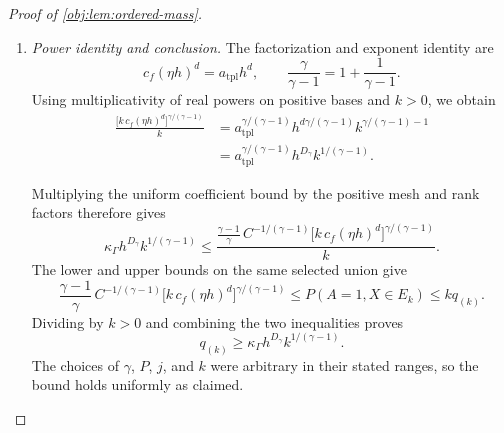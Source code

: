 \begin{proof}[Proof of \cref{obj:lem:ordered-mass}]
\begin{enumerate}
More explicitly, each microcell is the rectangle
\[
E_{Q\ell}
=
\prod_{i=1}^d
\left[
(a_Q)_i+h\left((v_\ell)_i-\frac\eta2\right),
(a_Q)_i+h\left((v_\ell)_i+\frac\eta2\right)
\right].
\]
Each coordinate interval has length \(\eta h\), so
\[
\operatorname{Leb}(E_{Q\ell})=(\eta h)^d.
\]

By \cref{obj:ass:density}, integration of the density over each microcell yields
\[
\nu(E_{Q\ell})
=
\int_{E_{Q\ell}}f(x)\,dx
\ge c_f\operatorname{Leb}(E_{Q\ell})
=c_f(\eta h)^d.
\]
The selected microcells are measurable and pairwise disjoint. Thus
\[
\begin{aligned}
\nu(E_k)
&=
\sum_{Q\in\mathcal Q_{h,k}}
\nu(E_{Q,\ell_{\min}(Q)})\\
&\ge k\,c_f(\eta h)^d.
\end{aligned}
\]

The exponent \(\gamma/(\gamma-1)\) and the setwise coefficient are positive. Applying monotonicity of this power and the setwise estimate already established gives
\[
\begin{aligned}
&\frac{\gamma-1}{\gamma}\,
C^{-1/(\gamma-1)}
\bigl[k\,c_f(\eta h)^d\bigr]^{\gamma/(\gamma-1)}\\
&\qquad\le
\frac{\gamma-1}{\gamma}\,
C^{-1/(\gamma-1)}
\nu(E_k)^{\gamma/(\gamma-1)}
\le P(A=1,X\in E_k).
\end{aligned}
\]

\item \emph{Power identity and conclusion.}
The factorization and exponent identity are
\[
c_f(\eta h)^d=a_{\mathrm{tpl}}h^d,
\qquad
\frac{\gamma}{\gamma-1}
=
1+\frac1{\gamma-1}.
\]
Using multiplicativity of real powers on positive bases and \(k>0\), we obtain
\[
\begin{aligned}
\frac{\bigl[k\,c_f(\eta h)^d\bigr]^{\gamma/(\gamma-1)}}{k}
&=
a_{\mathrm{tpl}}^{\gamma/(\gamma-1)}
h^{d\gamma/(\gamma-1)}
k^{\gamma/(\gamma-1)-1}\\
&=
a_{\mathrm{tpl}}^{\gamma/(\gamma-1)}
h^{D_\gamma}k^{1/(\gamma-1)}.
\end{aligned}
\]

Multiplying the uniform coefficient bound by the positive mesh and rank factors therefore gives
\[
\kappa_\Gamma h^{D_\gamma}k^{1/(\gamma-1)}
\le
\frac{
\frac{\gamma-1}{\gamma}\,
C^{-1/(\gamma-1)}
\bigl[k\,c_f(\eta h)^d\bigr]^{\gamma/(\gamma-1)}
}{k}.
\]
The lower and upper bounds on the same selected union give
\[
\frac{\gamma-1}{\gamma}\,
C^{-1/(\gamma-1)}
\bigl[k\,c_f(\eta h)^d\bigr]^{\gamma/(\gamma-1)}
\le P(A=1,X\in E_k)
\le kq_{(k)}.
\]
Dividing by \(k>0\) and combining the two inequalities proves
\[
q_{(k)}
\ge
\kappa_\Gamma h^{D_\gamma}k^{1/(\gamma-1)}.
\]
The choices of \(\gamma\), \(P\), \(j\), and \(k\) were arbitrary in their stated ranges, so the bound holds uniformly as claimed.
\end{enumerate}
\end{proof}
